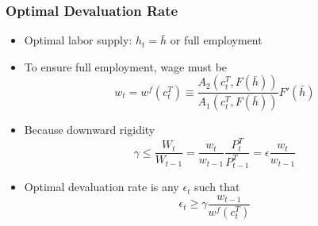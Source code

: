 \documentclass[mathserif]{beamer}
\begin{document}
    \begin{frame}
        \frametitle{Optimal Devaluation Rate}
        \begin{itemize}
            \item Optimal labor supply: $h_t = \bar{h}$ or full employment
            \item To ensure full employment, wage must be
                \begin{equation}
                    w_t = w^f(c^T_t) \equiv \frac{A_2(c^T_t, F(\bar{h}))}{A_1(c^T_t, F(\bar{h}))} F'(\bar{h})
                \end{equation}
            \item Because downward rigidity
                \begin{equation*}
                    \gamma \le \frac{W_t}{W_{t-1}} = \frac{w_t}{w_{t-1}} \frac{P^T_t}{P^T_{t-1}} = \epsilon \frac{w_t}{w_{t-1}}
                \end{equation*}
            \item Optimal devaluation rate is any $\epsilon_t$ such that
                \begin{equation}
                    \epsilon_t \ge \gamma \frac{w_{t-1}}{w^f(c^T_t)}
                \end{equation}
        \end{itemize}
    \end{frame}
\end{document}
